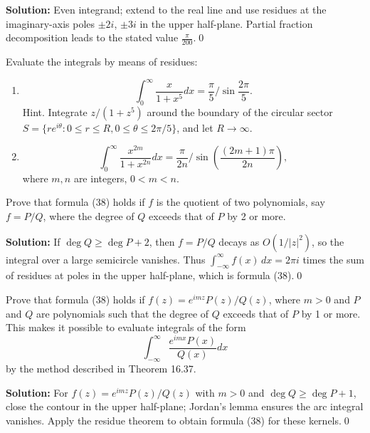 \noindent\textbf{Solution:}
Even integrand; extend to the real line and use residues at the imaginary-axis poles $\pm2i$, $\pm3i$ in the upper half-plane. Partial fraction decomposition leads to the stated value $\frac{\pi}{200}$.\qed


\begin{problembox}
Evaluate the integrals by means of residues:
\begin{enumerate}[label=(\alph*)]
\item \[ \int_0^{\infty} \frac{x}{1 + x^5} dx = \frac{\pi}{5} / \sin \frac{2\pi}{5}. \]
Hint. Integrate \( z / (1 + z^5) \) around the boundary of the circular sector \( S = \{ r e^{i\theta} : 0 \leq r \leq R, 0 \leq \theta \leq 2\pi / 5 \} \), and let \( R \to \infty \).
\item \[ \int_0^{\infty} \frac{x^{2m}}{1 + x^{2n}} dx = \frac{\pi}{2n}/ \sin \left( \frac{(2m + 1) \pi}{2n} \right), \]
where \( m, n \) are integers, \( 0 < m < n \).
\end{enumerate}
\end{problembox}





\begin{problembox}
Prove that formula (38) holds if \( f \) is the quotient of two polynomials, say \( f = P/Q \), where the degree of \( Q \) exceeds that of \( P \) by 2 or more.
\end{problembox}

\noindent\textbf{Solution:}
If $\deg Q\ge \deg P+2$, then $f=P/Q$ decays as $O(1/|z|^2)$, so the integral over a large semicircle vanishes. Thus $\int_{-\infty}^{\infty} f(x)\,dx=2\pi i$ times the sum of residues at poles in the upper half-plane, which is formula (38).\qed


\begin{problembox}
Prove that formula (38) holds if \( f(z) = e^{imz} P(z) / Q(z) \), where \( m > 0 \) and \( P \) and \( Q \) are polynomials such that the degree of \( Q \) exceeds that of \( P \) by 1 or more. This makes it possible to evaluate integrals of the form
\[ \int_{-\infty}^{\infty} \frac{e^{imx} P(x)}{Q(x)} dx \]
by the method described in Theorem 16.37.
\end{problembox}

\noindent\textbf{Solution:}
For $f(z)=e^{imz}P(z)/Q(z)$ with $m>0$ and $\deg Q\ge \deg P+1$, close the contour in the upper half-plane; Jordan's lemma ensures the arc integral vanishes. Apply the residue theorem to obtain formula (38) for these kernels.\qed


